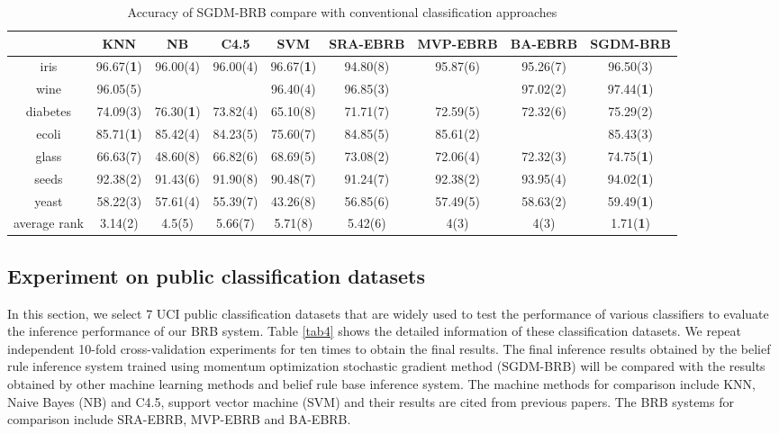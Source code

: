 \documentclass{ieeeaccess}
\begin{document}
\begin{table}
    \caption{Accuracy of SGDM-BRB compare with conventional classification approaches}
    \centering
    \label{tab5}
    \begin{tabular}{|c|c|c|c|c|c|c|c|c|}
        \hline
                     & KNN               & NB                & C4.5     & SVM               & SRA-EBRB & MVP-EBRB & BA-EBRB  & SGDM-BRB          \\
        \hline
        iris         & 96.67(\textbf{1}) & 96.00(4)          & 96.00(4) & 96.67(\textbf{1}) & 94.80(8) & 95.87(6) & 95.26(7) & 96.50(3)          \\
        wine         & 96.05(5)          &                   &          & 96.40(4)          & 96.85(3) &          & 97.02(2) & 97.44(\textbf{1}) \\
        diabetes     & 74.09(3)          & 76.30(\textbf{1}) & 73.82(4) & 65.10(8)          & 71.71(7) & 72.59(5) & 72.32(6) & 75.29(2)          \\
        ecoli        & 85.71(\textbf{1}) & 85.42(4)          & 84.23(5) & 75.60(7)          & 84.85(5) & 85.61(2) &          & 85.43(3)          \\
        glass        & 66.63(7)          & 48.60(8)          & 66.82(6) & 68.69(5)          & 73.08(2) & 72.06(4) & 72.32(3) & 74.75(\textbf{1}) \\
        seeds        & 92.38(2)          & 91.43(6)          & 91.90(8) & 90.48(7)          & 91.24(7) & 92.38(2) & 93.95(4) & 94.02(\textbf{1}) \\
        yeast        & 58.22(3)          & 57.61(4)          & 55.39(7) & 43.26(8)          & 56.85(6) & 57.49(5) & 58.63(2) & 59.49(\textbf{1}) \\
        \hline
        average rank & 3.14(2)           & 4.5(5)            & 5.66(7)  & 5.71(8)           & 5.42(6)  & 4(3)     & 4(3)     & 1.71(\textbf{1})  \\
        \hline
    \end{tabular}
\end{table}

\subsection{Experiment on public classification datasets}
In this section, we select 7 UCI public classification datasets that are widely used to test the performance of various classifiers to evaluate the inference performance of our BRB system.
Table \ref{tab4} shows the detailed information of these classification datasets.
We repeat independent 10-fold cross-validation experiments for ten times to obtain the final results.
The final inference results obtained by the belief rule inference system trained using momentum optimization stochastic gradient method (SGDM-BRB) will be compared with the results obtained by
other machine learning methods and belief rule base inference system.
The machine methods for comparison include KNN, Naive Bayes (NB) and C4.5, support vector machine (SVM)
and their results are cited from previous papers\cite{a22,a27}.
The BRB systems for comparison include SRA-EBRB\cite{a20}, MVP-EBRB\cite{a21} and BA-EBRB\cite{a22}.
\end{document}
